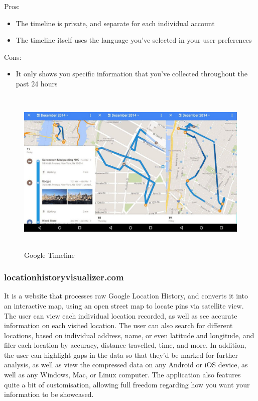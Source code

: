 \documentclass[12p]{article}
\begin{document}
Pros:
\begin{itemize}
    \item The timeline is private, and separate for each individual account
    \item The timeline itself uses the language you've selected in your user preferences
\end{itemize}

Cons:
\begin{itemize}
    \item It only shows you specific information that you've collected throughout the past 24 hours
\end{itemize}

\begin{figure}[ht]
	    \center
        \includegraphics[height=8cm,keepaspectratio]{pics/state-of-the-art/Google_Timeline.jpg}
        \caption{Google Timeline}
    \end{figure}

\subsubsection{locationhistoryvisualizer.com}
It is a website that processes raw Google Location History, and converts it into an interactive map, using an open street map to locate pins via satellite view. The user can view each individual location recorded, as well as see accurate information on each visited location. The user can also search for different locations, based on individual address, name, or even latitude and longitude, and filer each location by accuracy, distance travelled, time, and more. In addition, the user can highlight gaps in the data so that they’d be marked for further analysis, as well as view the compressed data on any Android or iOS device, as well as any Windows, Mac, or Linux computer. The application also features quite a bit of customisation, allowing full freedom regarding how you want your information to be showcased.
\end{document}
